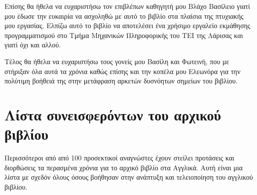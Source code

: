\documentclass[10pt]{book}
\begin{document}
Επίσης θα ήθελα να ευχαριστήσω τον επιβλέπων καθηγητή μου Βλάχο Βασίλειο γιατί μου έδωσε την ευκαιρία να ασχοληθώ με αυτό το βιβλίο στα πλαίσια της πτυχιακής μου εργασίας. Ελπίζω αυτό το βιβλίο να αποτελέσει ένα χρήσιμο εργαλείο εκμάθησης προγραμματισμού στο Τμήμα Μηχανικών Πληροφορικής του ΤΕΙ της Λάρισας και γιατί όχι και αλλού.

Τέλος θα ήθελα να ευχαριστήσω τους γονείς μου Βασίλη και Φωτεινή, που με στήριξαν όλα αυτά τα χρόνια καθώς επίσης και την κοπέλα μου Ελεωνόρα για την πολύτιμη βοήθειά της στην μετάφραση αρκετών δυσνόητων σημείων του βιβλίου.


\section*{Λίστα συνεισφερόντων του αρχικού βιβλίου}


Περισσότεροι από από 100 προσεκτικοί αναγνώστες έχουν στείλει προτάσεις και διορθώσεις 
τα περασμένα χρόνια για το αρχικό βιβλίο στα Αγγλικά. Αυτή είναι μια λίστα με σχεδόν όλους 
όσους βοήθησαν στην ανάπτυξη και τελειοποίηση του αγγλικού βιβλίου. 
\end{document}
